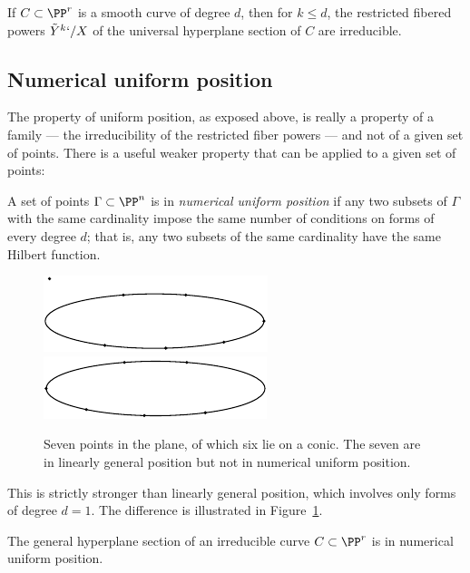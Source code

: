 \begin{corollary}\label{hyperplane section monodromy} If $C\subset \PP^r$
is a smooth curve of degree $d$, then
for $k\leq d$, the restricted fibered powers $\tilde Y^k`/X$  of the
universal hyperplane section
of $C$ are irreducible.
\end{corollary}

\subsection*{Numerical uniform position}

The property of uniform position, as exposed above, is really a property
of a family --- the irreducibility of the restricted
fiber powers --- and not of a given set of points. There is a useful
weaker property that
can be applied to a given set of points:

\begin{definition}
 A set of points $\Gamma\subset \PP^n$ is in \emph{numerical uniform
 position} if
 any two subsets of $\Gamma$ with the same cardinality impose the same
 number of conditions on forms of every degree $d$; that is, any two subsets
 of the same cardinality have the same Hilbert function.
%
\begin{figure}
\leavevmode
\vbox{\offinterlineskip
\hbox{\includegraphics[scale=1.3,viewport=-10 37 118 39,clip]{main/Fig10-2}}%
\hbox{\includegraphics[scale=1.3,viewport=0 0 118 33,clip]{main/Fig10-2a}}}
\caption{
Seven
points in the plane,
of which six lie
on a conic. The seven are in linearly general 
position
but not 
in numerical
uniform position.}
\label{numerical uniform is stronger}
\end{figure}
%

This is strictly stronger than linearly general position, which 
involves only forms of degree $d=1$. The difference is illustrated
in Figure~\ref{numerical uniform is stronger}.
\end{definition}

\begin{corollary}\label{numerical
uniform position lemma}
The general hyperplane section of an irreducible curve
$C\subset \PP^r$ is in numerical uniform position.
\unif
\end{corollary}

